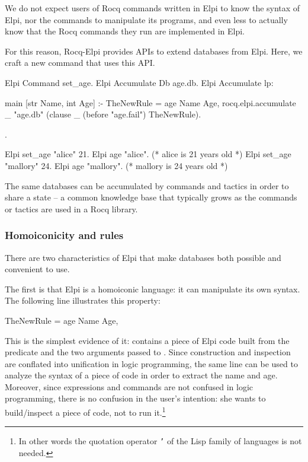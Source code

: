 \documentclass{these-ISSS}
\newenvironment{elpicode}
  {\VerbatimEnvironment\begin{elpibox}\begin{xelpicode}}{\end{xelpicode}
\end{elpibox}}
\newenvironment{rocqcode}
  {\VerbatimEnvironment\begin{rocqbox}\begin{xrocqcode}}{\end{xrocqcode}
\end{rocqbox}}
\begin{document}
We do not expect users of Rocq commands written in Elpi to know the syntax of
Elpi, nor the commands to manipulate its programs, and even less to actually
know that the Rocq commands they run are implemented in Elpi.


For this reason, Rocq-Elpi provides APIs to extend databases from Elpi. Here,
we craft a new command  that uses this API.

\begin{rocqcode}
Elpi Command set_age.
Elpi Accumulate Db age.db.
Elpi Accumulate lp:{{

  main [str Name, int Age] :-
    TheNewRule = age Name Age,
    rocq.elpi.accumulate _ "age.db"
      (clause _ (before "age.fail") TheNewRule).

}}.

Elpi set_age "alice" 21.
Elpi age "alice". (* alice is 21 years old *)
Elpi set_age "mallory" 24.
Elpi age "mallory". (* mallory is 24 years old *)
\end{rocqcode}


The same databases can be accumulated by commands and tactics in order to
share a state -- a common knowledge base that typically grows as the commands
or tactics are used in a Rocq library.

\subsubsection{Homoiconicity and rules}


There are two characteristics of Elpi that make databases both possible and
convenient to use.


The first is that Elpi is a homoiconic language: it can manipulate its own
syntax. The following line illustrates this property:
\begin{elpicode}
TheNewRule = age Name Age,
\end{elpicode}
This is the simplest evidence of it:  contains a piece of
Elpi code built from the  predicate and the two arguments passed to
. Since construction and inspection are conflated into unification
in logic programming, the same line can be used to analyze the syntax of a
piece of code in order to extract the name and age. Moreover, since expressions
and commands are not confused in logic programming, there is no confusion
in the user's intention: she wants to build/inspect a piece of code, not to run
it.\footnote{In other words the quotation operator \texttt{'} of the Lisp family
of languages is not needed.}
\end{document}
